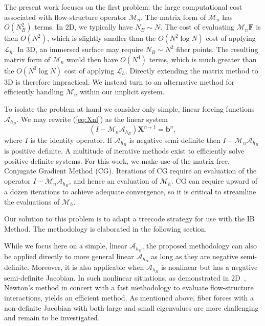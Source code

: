 \documentclass[preprint,12pt]{elsarticle}
\newcommand{\B}[1]{\mathbf{#1}}
\newcommand{\C}[1]{\mathcal{#1}}
\begin{document}
The present work focuses on the first problem: the large computational cost associated with flow-structure operator $\C{M}_n$. The matrix form of $\C{M}_n$ has $O(N_B^2)$ terms. In 2D, we typically have $N_B\sim N$. The cost of evaluating $\C{M}_{n}\B{F}$ is then $O(N^2)$, which is slightly smaller than the $O(N^2\log N)$ cost of applying $\C{L}_h$. In 3D,  an immersed surface may require $N_B\sim N^2$ fiber points. The resulting matrix form of $\C{M}_n$ would then have $O(N^4)$ terms, which is much greater than the $O(N^3\log N)$ cost of applying $\C{L}_h$. Directly extending the matrix method to 3D is therefore impractical.
We instead turn to an alternative method for efficiently handling $\C{M}_n$ within our implicit system.

To isolate the problem at hand we consider only simple, linear forcing functions $\C{A}_{h_B}$. We may rewrite (\ref{eq:Xnl}) as the linear system
\begin{equation}
(I - \C{M}_n\C{A}_{h_B}) \B{X}^{n+1} = \B{b}^n,
\label{eq:LinearSystem}
\end{equation}
where $I$ is the identity operator. If $\C{A}_{h_B}$ is negative semi-definite then $I - \C{M}_n\C{A}_{h_B}$ is positive definite. A multitude of iterative methods exist to efficiently solve positive definite systems. For this work, we make use of the matrix-free,  Conjugate Gradient Method (CG). Iterations of CG require an evaluation of the operator $I - \C{M}_n\C{A}_{h_B}$, and hence an evaluation of $\C{M}_h$. CG can require upward of a dozen iterations to achieve adequate convergence, so it is critical to streamline the evaluations of $\C{M}_h$.

Our solution to this problem is to adapt a treecode strategy for use with the IB Method. The methodology is elaborated in the following section.

While we focus here on a simple, linear  $\C{A}_{h_B}$, the proposed methodology can also be applied directly to more general linear $\C{A}_{h_B}$
as long as they are negative semi-definite. Moreover, it is also applicable when $\C{A}_{h_B}$ is nonlinear but has a negative semi-definite Jacobian. In such nonlinear situations,  
as demonstrated in 2D~\cite{IBM_Implicit2D},   Newton's method in concert with a fast methodology to evaluate flow-structure interactions,  yields an efficient method.
As mentioned above, fiber forces with a non-definite Jacobian with both large and small eigenvalues are more challenging and remain to be investigated.
\end{document}
